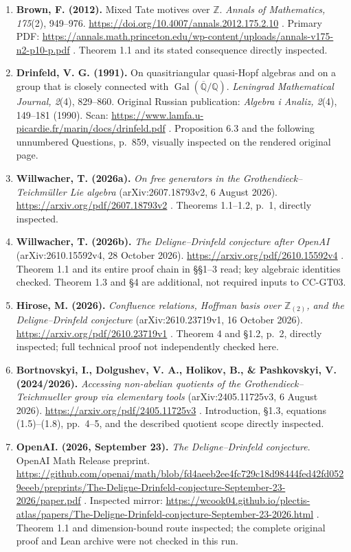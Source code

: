 \documentclass[11pt,a4paper]{article}
\providecommand{\tightlist}{\setlength{\itemsep}{0pt}\setlength{\parskip}{0pt}}
\theoremstyle{definition}\newtheorem{definition}[theorem]{Definition}
\theoremstyle{remark}\newtheorem{remark}[theorem]{Remark}
\begin{document}
\begin{enumerate}
\def\labelenumi{\arabic{enumi}.}
\tightlist
\item
  \textbf{Brown, F. (2012).} Mixed Tate motives over \(\mathbb Z\).
  \emph{Annals of Mathematics, 175}(2), 949--976.
  \url{https://doi.org/10.4007/annals.2012.175.2.10} . Primary PDF:
  \url{https://annals.math.princeton.edu/wp-content/uploads/annals-v175-n2-p10-p.pdf}
  . Theorem 1.1 and its stated consequence directly inspected.
\item
  \textbf{Drinfeld, V. G. (1991).} On quasitriangular quasi-Hopf
  algebras and on a group that is closely connected with
  \(\operatorname{Gal}(\overline{\mathbb Q}/\mathbb Q)\).
  \emph{Leningrad Mathematical Journal, 2}(4), 829--860. Original
  Russian publication: \emph{Algebra i Analiz, 2}(4), 149--181 (1990).
  Scan: \url{https://www.lamfa.u-picardie.fr/marin/docs/drinfeld.pdf} .
  Proposition 6.3 and the following unnumbered Questions, p.~859,
  visually inspected on the rendered original page.
\item
  \textbf{Willwacher, T. (2026a).} \emph{On free generators in the
  Grothendieck--Teichmüller Lie algebra} (arXiv:2607.18793v2, 6 August
  2026). \url{https://arxiv.org/pdf/2607.18793v2} . Theorems 1.1--1.2, p.~1,
  directly inspected.
\item
  \textbf{Willwacher, T. (2026b).} \emph{The Deligne--Drinfeld
  conjecture after OpenAI} (arXiv:2610.15592v4, 28 October 2026).
  \url{https://arxiv.org/pdf/2610.15592v4} . Theorem 1.1 and its entire proof
  chain in §§1--3 read; key algebraic identities checked. Theorem 1.3
  and §4 are additional, not required inputs to CC-GT03.
\item
  \textbf{Hirose, M. (2026).} \emph{Confluence relations, Hoffman basis
  over \(\mathbb Z_{(2)}\), and the Deligne--Drinfeld conjecture}
  (arXiv:2610.23719v1, 16 October 2026).
  \url{https://arxiv.org/pdf/2610.23719v1} . Theorem 4 and §1.2, p.~2,
  directly inspected; full technical proof not independently checked
  here.
\item
  \textbf{Bortnovskyi, I., Dolgushev, V. A., Holikov, B., \&
  Pashkovskyi, V. (2024/2026).} \emph{Accessing non-abelian quotients of
  the Grothendieck--Teichmueller group via elementary tools}
  (arXiv:2405.11725v3, 6 August 2026).
  \url{https://arxiv.org/pdf/2405.11725v3} . Introduction, §1.3, equations
  (1.5)--(1.8), pp.~4--5, and the described quotient scope directly
  inspected.
\item
  \textbf{OpenAI. (2026, September 23).} \emph{The Deligne--Drinfeld
  conjecture}. OpenAI Math Release preprint.
  \url{https://github.com/openai/math/blob/fd4aeeb2ee4fc729c18d98444fed42fd0529eeeb/preprints/The-Deligne-Drinfeld-conjecture-September-23-2026/paper.pdf}
  . Inspected mirror:
  \url{https://wcook04.github.io/plectis-atlas/papers/The-Deligne-Drinfeld-conjecture-September-23-2026.html}
  . Theorem 1.1 and dimension-bound route inspected; the complete
  original proof and Lean archive were not checked in this run.
\end{enumerate}
\end{document}
